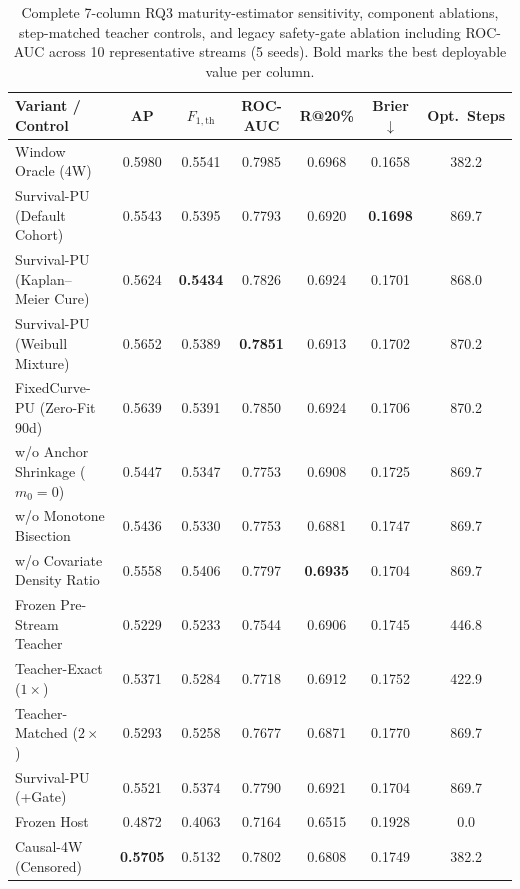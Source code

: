 \documentclass[10pt,a4paper]{article}
\begin{document}
\begin{table}[!htbp]
\centering
\caption{Complete 7-column RQ3 maturity-estimator sensitivity, component ablations, step-matched teacher controls, and legacy safety-gate ablation including ROC-AUC across 10 representative streams (5 seeds). Bold marks the best deployable value per column.}
\label{tab:or_rq3_full}
\fontsize{7.5}{9.0}\selectfont
\setlength{\tabcolsep}{2.4pt}
\begin{tabular*}{\textwidth}{@{\extracolsep\fill}lcccccc@{}}
\toprule
\textbf{Variant / Control} & \textbf{AP} & \textbf{$F_{1,\mathrm{th}}$} & \textbf{ROC-AUC} & \textbf{R@20\%} & \textbf{Brier$\downarrow$} & \textbf{Opt.\ Steps} \\
\midrule
Window Oracle (4W) & 0.5980 & 0.5541 & 0.7985 & 0.6968 & 0.1658 & 382.2 \\
\midrule
Survival-PU (Default Cohort) & 0.5543 & 0.5395 & 0.7793 & 0.6920 & \textbf{0.1698} & 869.7 \\
Survival-PU (Kaplan--Meier Cure) & 0.5624 & \textbf{0.5434} & 0.7826 & 0.6924 & 0.1701 & 868.0 \\
Survival-PU (Weibull Mixture) & 0.5652 & 0.5389 & \textbf{0.7851} & 0.6913 & 0.1702 & 870.2 \\
FixedCurve-PU (Zero-Fit 90d) & 0.5639 & 0.5391 & 0.7850 & 0.6924 & 0.1706 & 870.2 \\
\midrule
w/o Anchor Shrinkage ($m_0=0$) & 0.5447 & 0.5347 & 0.7753 & 0.6908 & 0.1725 & 869.7 \\
w/o Monotone Bisection & 0.5436 & 0.5330 & 0.7753 & 0.6881 & 0.1747 & 869.7 \\
w/o Covariate Density Ratio & 0.5558 & 0.5406 & 0.7797 & \textbf{0.6935} & 0.1704 & 869.7 \\
Frozen Pre-Stream Teacher & 0.5229 & 0.5233 & 0.7544 & 0.6906 & 0.1745 & 446.8 \\
\midrule
Teacher-Exact ($1\times$) & 0.5371 & 0.5284 & 0.7718 & 0.6912 & 0.1752 & 422.9 \\
Teacher-Matched ($2\times$) & 0.5293 & 0.5258 & 0.7677 & 0.6871 & 0.1770 & 869.7 \\
Survival-PU (+Gate) & 0.5521 & 0.5374 & 0.7790 & 0.6921 & 0.1704 & 869.7 \\
\midrule
Frozen Host & 0.4872 & 0.4063 & 0.7164 & 0.6515 & 0.1928 & 0.0 \\
Causal-4W (Censored) & \textbf{0.5705} & 0.5132 & 0.7802 & 0.6808 & 0.1749 & 382.2 \\
\bottomrule
\end{tabular*}
\end{table}
\end{document}
